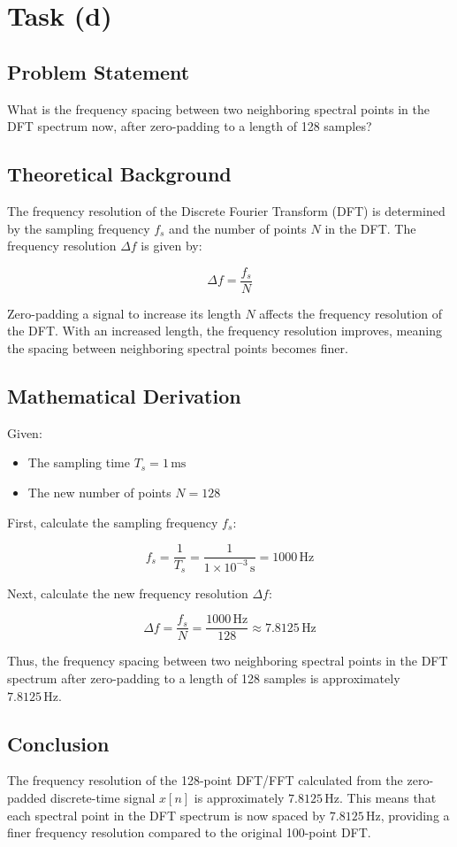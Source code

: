 \item[(d)]
\section*{Task (d)}

\subsection*{Problem Statement}
What is the frequency spacing between two neighboring spectral points in the DFT spectrum now, after zero-padding to a length of 128 samples?

\subsection*{Theoretical Background}
The frequency resolution of the Discrete Fourier Transform (DFT) is determined by the sampling frequency \( f_s \) and the number of points \( N \) in the DFT. The frequency resolution \( \Delta f \) is given by:

\[ \Delta f = \frac{f_s}{N} \]

Zero-padding a signal to increase its length \( N \) affects the frequency resolution of the DFT. With an increased length, the frequency resolution improves, meaning the spacing between neighboring spectral points becomes finer.

\subsection*{Mathematical Derivation}
Given:
\begin{itemize}
    \item The sampling time \( T_s = 1 \, \text{ms} \)
    \item The new number of points \( N = 128 \)
\end{itemize}

First, calculate the sampling frequency \( f_s \):

\[ f_s = \frac{1}{T_s} = \frac{1}{1 \times 10^{-3} \, \text{s}} = 1000 \, \text{Hz} \]

Next, calculate the new frequency resolution \( \Delta f \):

\[ \Delta f = \frac{f_s}{N} = \frac{1000 \, \text{Hz}}{128} \approx 7.8125 \, \text{Hz} \]

Thus, the frequency spacing between two neighboring spectral points in the DFT spectrum after zero-padding to a length of 128 samples is approximately \( 7.8125 \, \text{Hz} \).

\subsection*{Conclusion}
The frequency resolution of the 128-point DFT/FFT calculated from the zero-padded discrete-time signal \( x[n] \) is approximately \( 7.8125 \, \text{Hz} \). This means that each spectral point in the DFT spectrum is now spaced by \( 7.8125 \, \text{Hz} \), providing a finer frequency resolution compared to the original 100-point DFT.
